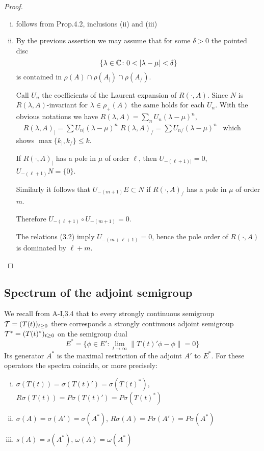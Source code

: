 \begin{proof}
\begin{enumerate}[(i), wide]
\item 
follows from Prop.4.2, inclusions (ii) and (iii)

\item 
By the previous assertion we may assume that for some $\delta > 0$ the pointed disc
\[
\{\lambda \in \mathbb{C} \colon 0 < |\lambda-\mu| < \delta\}
\]
is contained in $\rho(A) \cap \rho(A_{|}) \cap \rho(A_{/})$.

Call $U_{n}$ the coefficients of the Laurent expansion of $R(\cdot,A)$.
Since $N$ is $R(\lambda,A)$-invariant for $\lambda \in \rho_{+}(A)$ the same holds for each $U_{n}$.
With the obvious notations we have \quad
$R(\lambda,A) = \sum_{n} U_{n}(\lambda-\mu)^{n}$, $\quad R(\lambda,A)_{|} = \sum U_{n|}(\lambda-\mu)^{n}$ \quad {} \quad $R(\lambda,A)_{/} = \sum U_{n/}(\lambda-\mu)^{n}$~
which shows $\max\{k_{|},k_{/}\} \leq k$.

If $R(\cdot,A)_{|}$ has a pole in $\mu$ of order $\ell$, then $U_{-(\ell+1)|} = 0$, \ie $U_{-(\ell+1)}N = \{0\}$.

Similarly it follows that $U_{-(m+1)}E \subset N$ if $R(\cdot,A)_{/}$ has a pole in $\mu$ of order $m$.

Therefore $U_{-(\ell+1)} \circ U_{-(m+1)} = 0$.

The relations (3.2) imply $U_{-(m+\ell+1)} = 0$, hence the pole order of $R(\cdot,A)$ is dominated by $\ell + m$.
\end{enumerate}
\end{proof}

\subsection{Spectrum of the adjoint semigroup}\label{subsec:a3-4.4}
We recall from A-I,3.4 that to every strongly continuous semigroup $\mathcal{T} = (T(t))_{t \geq 0}$ there corresponds a strongly continuous adjoint semigroup $\mathcal{T}^* = (T(t)^*)_{t \geq 0}$ on the semigroup dual
\[
E^* = \{\phi \in E' \colon \lim_{t \to \infty} \|T(t)'\phi-\phi\| = 0\}
\]
Its generator $A^*$ is the maximal restriction of the adjoint $A'$ to $E^*$.
For these operators the spectra coincide, or more precisely:
\begin{enumerate}[(i)]
\item 
$\sigma(T(t)) = \sigma(T(t)') = \sigma(T(t)^*)$,\\
$R\sigma(T(t)) = P\sigma(T(t)') = P\sigma(T(t)^*)$

\item 
$\sigma(A) = \sigma(A') = \sigma(A^*)$, $R\sigma(A) = P\sigma(A') = P\sigma(A^*)$
\item 
$s(A) = s(A^*)$, $\omega(A) = \omega(A^*)$
\end{enumerate}

